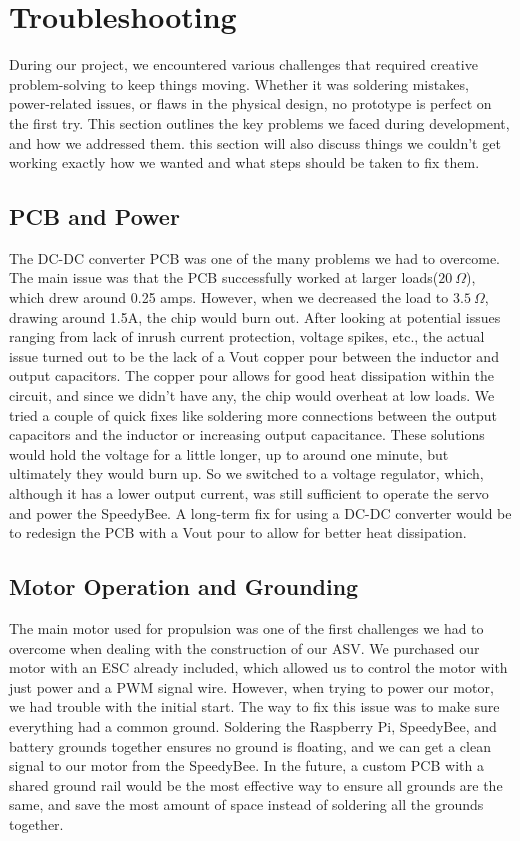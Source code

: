 \section{Troubleshooting}
During our project, we encountered various challenges that required creative problem-solving to keep things moving. Whether it was soldering mistakes, power-related issues, or flaws in the physical design, no prototype is perfect on the first try. This section outlines the key problems we faced during development, and how we addressed them. this section will also discuss things we couldn't get working exactly how we wanted and what steps should be taken to fix them.
\subsection{PCB and Power}
The DC-DC converter PCB was one of the many problems we had to overcome. The main issue was that the PCB successfully worked at larger loads($20~\Omega$), which drew around 0.25 amps. However, when we decreased the load to $3.5~\Omega$, drawing around 1.5A, the chip would burn out. After looking at potential issues ranging from lack of inrush current protection, voltage spikes, etc., the actual issue turned out to be the lack of a Vout copper pour between the inductor and output capacitors. The copper pour allows for good heat dissipation within the circuit, and since we didn't have any, the chip would overheat at low loads. We tried a couple of quick fixes like soldering more connections between the output capacitors and the inductor or increasing output capacitance. These solutions would hold the voltage for a little longer, up to around one minute, but ultimately they would burn up. So we switched to a voltage regulator, which, although it has a lower output current, was still sufficient to operate the servo and power the SpeedyBee. A long-term fix for using a DC-DC converter would be to redesign the PCB with a Vout pour to allow for better heat dissipation.
\subsection{Motor Operation and Grounding}
The main motor used for propulsion was one of the first challenges we had to overcome when dealing with the construction of our ASV. We purchased our motor with an ESC already included, which allowed us to control the motor with just power and a PWM signal wire. However, when trying to power our motor, we had trouble with the initial start. The way to fix this issue was to make sure everything had a common ground. Soldering the Raspberry Pi, SpeedyBee, and battery grounds together ensures no ground is floating, and we can get a clean signal to our motor from the SpeedyBee. In the future, a custom PCB with a shared ground rail would be the most effective way to ensure all grounds are the same, and save the most amount of space instead of soldering all the grounds together. 
